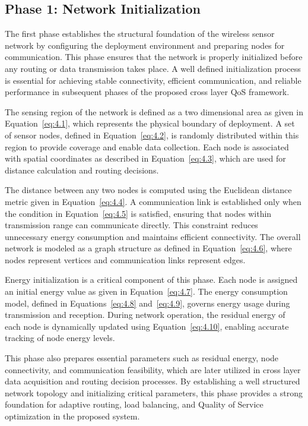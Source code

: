 \documentclass[a4paper,fleqn]{cas-dc}
\numberwithin{equation}{section}
\begin{document}
\subsection{Phase 1: Network Initialization}

The first phase establishes the structural foundation of the wireless sensor network by configuring the deployment environment and preparing nodes for communication. This phase ensures that the network is properly initialized before any routing or data transmission takes place. A well defined initialization process is essential for achieving stable connectivity, efficient communication, and reliable performance in subsequent phases of the proposed cross layer QoS framework.

The sensing region of the network is defined as a two dimensional area as given in Equation~\ref{eq:4.1}, which represents the physical boundary of deployment. A set of sensor nodes, defined in Equation~\ref{eq:4.2}, is randomly distributed within this region to provide coverage and enable data collection. Each node is associated with spatial coordinates as described in Equation~\ref{eq:4.3}, which are used for distance calculation and routing decisions.

The distance between any two nodes is computed using the Euclidean distance metric given in Equation~\ref{eq:4.4}. A communication link is established only when the condition in Equation~\ref{eq:4.5} is satisfied, ensuring that nodes within transmission range can communicate directly. This constraint reduces unnecessary energy consumption and maintains efficient connectivity. The overall network is modeled as a graph structure as defined in Equation~\ref{eq:4.6}, where nodes represent vertices and communication links represent edges.

Energy initialization is a critical component of this phase. Each node is assigned an initial energy value as given in Equation~\ref{eq:4.7}. The energy consumption model, defined in Equations~\ref{eq:4.8} and~\ref{eq:4.9}, governs energy usage during transmission and reception. During network operation, the residual energy of each node is dynamically updated using Equation~\ref{eq:4.10}, enabling accurate tracking of node energy levels.

This phase also prepares essential parameters such as residual energy, node connectivity, and communication feasibility, which are later utilized in cross layer data acquisition and routing decision processes. By establishing a well structured network topology and initializing critical parameters, this phase provides a strong foundation for adaptive routing, load balancing, and Quality of Service optimization in the proposed system.
\end{document}
